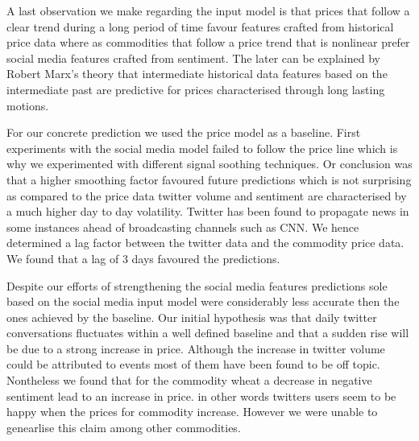  
  
  A last observation we make regarding the input model is that prices that follow a clear trend during a long period of time  favour features crafted from historical price data where as commodities that follow a price trend that is nonlinear prefer social media features crafted from sentiment. The later can be explained by Robert Marx's theory that intermediate historical data features based on the intermediate past are predictive for prices characterised through long lasting motions. 

For our concrete prediction we used the price model as a baseline. First experiments with the social media model failed to follow the price line which is why we experimented with different signal soothing techniques. Or conclusion was that a higher smoothing factor favoured future predictions which is not surprising as compared to the price data twitter volume and sentiment are characterised by a much higher day to day volatility. Twitter has been found to propagate news in some instances ahead of broadcasting channels such as CNN. We hence determined a lag factor between the twitter data and the commodity price data. We found that a lag of 3 days favoured the predictions. 

Despite our efforts of strengthening the social media features predictions sole based on  the social media input model were considerably less accurate then the ones achieved by the baseline. Our initial hypothesis was that daily twitter conversations fluctuates within a well defined baseline and that a sudden rise will be due to a strong increase in price. Although the increase in twitter volume could be attributed to events most of them have been found to be off topic. Nontheless we found that for the commodity wheat a decrease in negative sentiment lead to an increase in price. in other words twitters users seem to be happy when the prices for commodity increase. However we were unable to genearlise this claim among other commodities.
 
